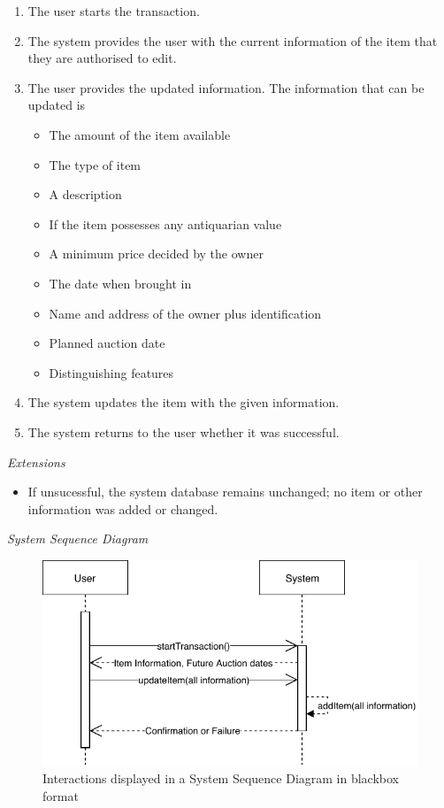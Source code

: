 \begin{enumerate}[noitemsep]
	\item The user starts the transaction.
	\item The system provides the user with the current information of the item that they are authorised to edit.
	\item The user provides the updated information. The information that can be updated is
	\begin{itemize}[noitemsep]
		\item The amount of the item available
		\item The type of item
		\item A description
		\item If the item possesses any antiquarian value
		\item A minimum price decided by the owner
		\item The date when brought in
		\item Name and address of the owner plus identification
		\item Planned auction date
		\item Distinguishing features
	\end{itemize}
	\item The system updates the item with the given information.
	\item The system returns to the user whether it was successful.
\end{enumerate}
\textsl{Extensions}
\begin{itemize}[noitemsep]
	\item If unsucessful, the system database remains unchanged; no item or other information was added or changed.
\end{itemize}
\textsl{System Sequence Diagram}
\begin{figure}[H]
	\centering
	\includegraphics[scale=1]{SD-bb-update.pdf}
	\caption*{Interactions displayed in a System Sequence Diagram in blackbox format}
\end{figure}
